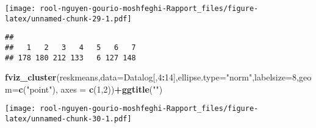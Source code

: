 \documentclass[
]{article}
\newenvironment{Shaded}{\begin{snugshade}}{\end{snugshade}}
\newcommand{\AttributeTok}[1]{\textcolor[rgb]{0.13,0.29,0.53}{#1}}
\newcommand{\DecValTok}[1]{\textcolor[rgb]{0.00,0.00,0.81}{#1}}
\newcommand{\FunctionTok}[1]{\textcolor[rgb]{0.13,0.29,0.53}{\textbf{#1}}}
\newcommand{\NormalTok}[1]{#1}
\newcommand{\OtherTok}[1]{\textcolor[rgb]{0.56,0.35,0.01}{#1}}
\newcommand{\SpecialCharTok}[1]{\textcolor[rgb]{0.81,0.36,0.00}{\textbf{#1}}}
\newcommand{\StringTok}[1]{\textcolor[rgb]{0.31,0.60,0.02}{#1}}
\begin{document}
\texttt{[image: rool-nguyen-gourio-moshfeghi-Rapport\_files/figure-latex/unnamed-chunk-29-1.pdf]}

\begin{Shaded}
\end{Shaded}

\begin{verbatim}
## 
##   1   2   3   4   5   6   7 
## 178 180 212 133   6 127 148
\end{verbatim}

\begin{Shaded}
\begin{Highlighting}[]
\FunctionTok{fviz\_cluster}\NormalTok{(reskmeans,}\AttributeTok{data=}\NormalTok{Datalog[,}\DecValTok{4}\SpecialCharTok{:}\DecValTok{14}\NormalTok{],}\AttributeTok{ellipse.type=}\StringTok{"norm"}\NormalTok{,}\AttributeTok{labelsize=}\DecValTok{8}\NormalTok{,}\AttributeTok{geom=}\FunctionTok{c}\NormalTok{(}\StringTok{"point"}\NormalTok{), }\AttributeTok{axes =} \FunctionTok{c}\NormalTok{(}\DecValTok{1}\NormalTok{,}\DecValTok{2}\NormalTok{))}\SpecialCharTok{+}\FunctionTok{ggtitle}\NormalTok{(}\StringTok{""}\NormalTok{)}
\end{Highlighting}
\end{Shaded}

\texttt{[image: rool-nguyen-gourio-moshfeghi-Rapport\_files/figure-latex/unnamed-chunk-30-1.pdf]}
\end{document}
